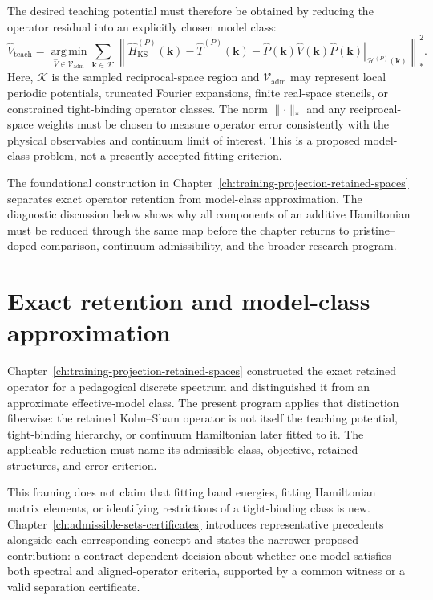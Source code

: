 The desired teaching potential must therefore be obtained by reducing the
operator residual into an explicitly chosen model class:
\begin{equation}
    \hat V_{\mathrm{teach}}
    =
    \operatorname*{arg\,min}_{\hat V\in\mathcal V_{\mathrm{adm}}}
    \sum_{\mathbf k\in\mathcal K}
    \left\|
        \hat H_{\mathrm{KS}}^{(P)}(\mathbf k)
        -
        \hat T^{(P)}(\mathbf k)
        -
        \left.
            \hat P(\mathbf k)
            \hat V(\mathbf k)
            \hat P(\mathbf k)
        \right|_{\mathcal H^{(P)}(\mathbf k)}
    \right\|_*^2.
\end{equation}
Here, $\mathcal K$ is the sampled reciprocal-space region and
$\mathcal V_{\mathrm{adm}}$ may represent local periodic potentials, truncated
Fourier expansions, finite real-space stencils, or constrained tight-binding
operator classes. The norm $\lVert\cdot\rVert_*$ and any reciprocal-space
weights must be chosen to measure operator error consistently with the physical
observables and continuum limit of interest. This is a proposed model-class
problem, not a presently accepted fitting criterion.

The foundational construction in
Chapter~\ref{ch:training-projection-retained-spaces} separates exact operator
retention from model-class approximation. The diagnostic discussion below
shows why all components of an additive Hamiltonian must be reduced through the
same map before the chapter returns to pristine--doped comparison, continuum
admissibility, and the broader research program.

\section{Exact retention and model-class approximation}

Chapter~\ref{ch:training-projection-retained-spaces} constructed the exact
retained operator for a pedagogical discrete spectrum and distinguished it from
an approximate effective-model class. The present program applies that
distinction fiberwise: the retained Kohn--Sham operator is not itself the
teaching potential, tight-binding hierarchy, or continuum Hamiltonian later
fitted to it. The applicable reduction must name its admissible class,
objective, retained structures, and error criterion.

This framing does not claim that fitting band energies, fitting Hamiltonian
matrix elements, or identifying restrictions of a tight-binding class is new.
Chapter~\ref{ch:admissible-sets-certificates} introduces representative
precedents alongside each corresponding concept and states the narrower
proposed contribution: a
contract-dependent decision about whether one model satisfies both spectral
and aligned-operator criteria, supported by a common witness or a valid
separation certificate.

